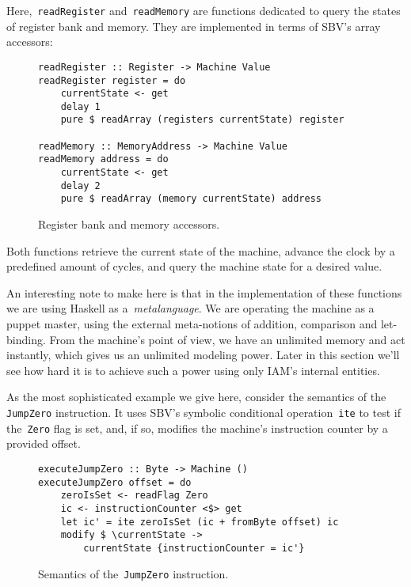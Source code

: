 Here,~\texttt{readRegister} and~\texttt{readMemory}
are functions dedicated to query the states of register bank and memory.
They are implemented in terms of SBV's array accessors:

\begin{figure}[H]
\begin{verbatim}
readRegister :: Register -> Machine Value
readRegister register = do
    currentState <- get
    delay 1
    pure $ readArray (registers currentState) register

readMemory :: MemoryAddress -> Machine Value
readMemory address = do
    currentState <- get
    delay 2
    pure $ readArray (memory currentState) address
\end{verbatim}
\caption{Register bank and memory accessors.}
\label{readRegMem}
\end{figure}

Both functions retrieve the current state of the machine, advance the clock by
a predefined amount of cycles, and query the machine state for a desired value.

An interesting note to make here is that in the implementation of these functions
we are using Haskell as a~\emph{metalanguage}. We are operating the machine as
a puppet master, using the external meta-notions of addition, comparison and let-binding.
From the machine's point of view, we have an unlimited memory and act instantly,
which gives us an unlimited modeling power. Later in this section we'll see how
hard it is to achieve such a power using only IAM's internal entities.

As the most sophisticated example we give here, consider the semantics of the
\texttt{JumpZero} instruction. It uses SBV's symbolic conditional
operation~\texttt{ite} to test if the~\texttt{Zero} flag
is set, and, if so, modifies the machine's instruction counter by a provided offset.

\begin{figure}[H]
\begin{verbatim}
executeJumpZero :: Byte -> Machine ()
executeJumpZero offset = do
    zeroIsSet <- readFlag Zero
    ic <- instructionCounter <$> get
    let ic' = ite zeroIsSet (ic + fromByte offset) ic
    modify $ \currentState ->
        currentState {instructionCounter = ic'}
\end{verbatim}
\caption{Semantics of the~\texttt{JumpZero} instruction.}
\label{jumpZeroSemantics}
\end{figure}

